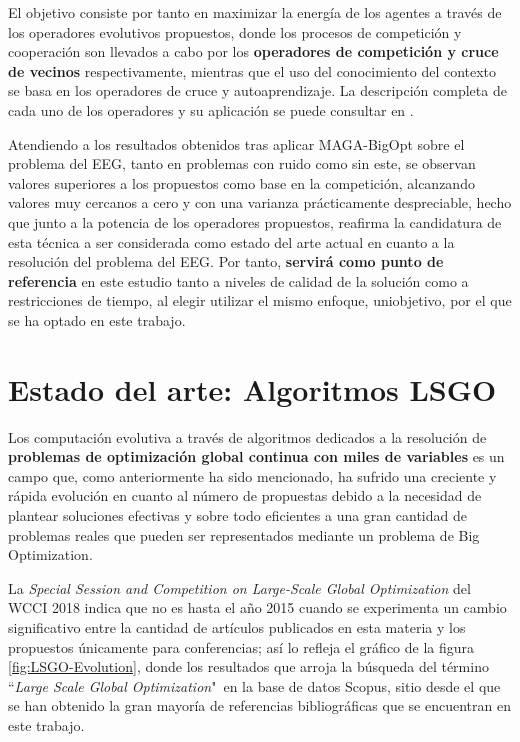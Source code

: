 El objetivo consiste por tanto en maximizar la energía de los agentes a través de los operadores evolutivos propuestos, donde los procesos de competición y cooperación son llevados a cabo por los \textbf{operadores de competición y cruce de vecinos} respectivamente, mientras que el uso del conocimiento del contexto se basa en los operadores de cruce y autoaprendizaje. La descripción completa de cada uno de los operadores y su aplicación se puede consultar en \cite{MAGA-BigOpt}.

Atendiendo a los resultados obtenidos tras aplicar MAGA-BigOpt sobre el problema del EEG, tanto en problemas con ruido como sin este, se observan valores superiores a los propuestos como base en la competición, alcanzando valores muy cercanos a cero y con una varianza prácticamente despreciable, hecho que junto a la potencia de los operadores propuestos, reafirma la candidatura de esta técnica a ser considerada como estado del arte actual en cuanto a la resolución del problema del EEG. Por tanto, \textbf{servirá como punto de referencia} en este estudio tanto a niveles de calidad de la solución como a restricciones de tiempo, al elegir utilizar el mismo enfoque, uniobjetivo, por el que se ha optado en este trabajo.

\section{Estado del arte: Algoritmos LSGO}

Los computación evolutiva a través de algoritmos dedicados a la resolución de \textbf{problemas de optimización global continua con miles de variables} es un campo que, como anteriormente ha sido mencionado, ha sufrido una creciente y rápida evolución en cuanto al número de propuestas debido a la necesidad de plantear soluciones efectivas y sobre todo eficientes a una gran cantidad de problemas reales que pueden ser representados mediante un problema de Big Optimization.

La \textit{Special Session and Competition on Large-Scale Global Optimization} del WCCI 2018\cite{WCCI-SHADEILS} indica que no es hasta el año 2015 cuando se experimenta un cambio significativo entre la cantidad de artículos publicados en esta materia y los propuestos únicamente para conferencias; así lo refleja el gráfico de la figura \ref{fig:LSGO-Evolution}, donde los resultados que arroja la búsqueda del término ``\textit{Large Scale Global Optimization}"\ en la base de datos Scopus\cite{SCOPUS}, sitio desde el que se han obtenido la gran mayoría de referencias bibliográficas que se encuentran en este trabajo.

